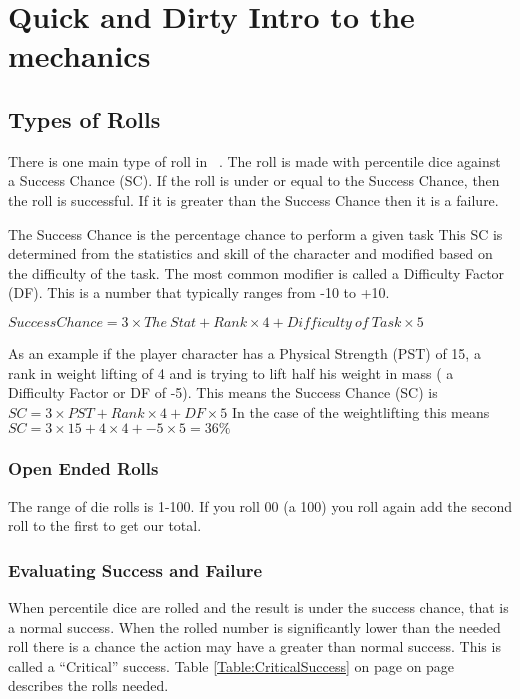 \chapter{Quick and Dirty Intro to the mechanics}

\section{Types of Rolls}

There is one main type of roll in \SH\ . The roll is 
made with percentile dice against a Success Chance (SC). If the roll 
is under or equal to the Success Chance, then the roll is successful.
If it is greater than the Success Chance then it is a failure.

The Success Chance is the percentage chance to perform a given task This SC is
determined from the statistics and skill of the character 
and modified based on the difficulty of the task. The most common 
modifier is called a Difficulty Factor (DF). This is a number that typically 
ranges from -10 to +10.

$ {Success Chance} = 3 \times {The\ Stat} + Rank \times 4 + {Difficulty\ of\ Task} \times 5 $

As an example if the player character has a Physical Strength (PST) of 15, a rank in 
weight lifting of 4 and is trying to lift half his weight in mass ( a Difficulty Factor or DF of -5). 
This means the Success Chance (SC) is $ SC = 3 \times PST + Rank \times 4 + DF \times 5 $
In the case of the weightlifting this means $ SC = 3 \times 15 + 4 \times 4 + -5 \times 5  = 36\% $

\subsection{Open Ended Rolls}

The range of die rolls is 1-100. If you roll 00 (a 100) you roll again add
the second roll to the first to get our total.

\subsection{Evaluating Success and Failure}

When percentile dice are rolled and the result is under the success chance, that
is a normal success. When the rolled number is significantly lower than the needed 
roll there is a chance the action may have a greater than normal success. This is 
called a ``Critical'' success. Table \ref{Table:CriticalSuccess} on page on
page~\pageref{Table:CriticalSuccess} describes the rolls needed.

